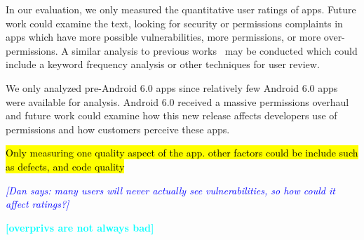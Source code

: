 \documentclass{sig-alternate-05-2015}
\newcommand{\todo}[1]{\textcolor{cyan}{\textbf{[#1]}}}
\newcommand{\dan}[1]{\textcolor{blue}{{\it [Dan says: #1]}}}
\begin{document}


In our evaluation, we only measured the quantitative user ratings of apps. Future work could examine the text, looking for security or permissions complaints in apps which have more possible vulnerabilities, more permissions, or more over-permissions. A similar analysis to previous works~\cite{Khalid_Mei_Examinging, Fu:2013:WPH:2487575.2488202} may be conducted which could include a keyword frequency analysis or other techniques for user review. %



We only analyzed pre-Android 6.0 apps since relatively few Android 6.0 apps were available for analysis. Android 6.0 received a massive permissions overhaul and future work could examine how this new release affects developers use of permissions and how customers perceive these apps.


\hl{Only measuring one quality aspect of the app. other factors could be include such as defects, and code quality}

\dan{many users will never actually see vulnerabilities, so how could it affect ratings?}

\todo{overprivs are not always bad}


\end{document}
